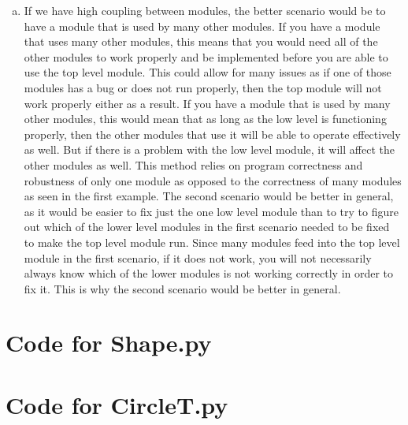 \documentclass[12pt]{article}
\begin{document}
\begin{enumerate}[a)]
\item If we have high coupling between modules, the better scenario would be to have a module 
that is used by many other modules. If you have a module that uses many other modules, this means 
that you would need all of the other modules to work properly and be implemented before you are 
able to use the top level module. This could allow for many issues as if one of those modules has 
a bug or does not run properly, then the top module will not work properly either as a result. If 
you have a module that is used by many other modules, this would mean that as long as the low 
level is functioning properly, then the other modules that use it will be able to operate 
effectively as well. But if there is a problem with the low level module, it will affect the 
other modules as well. This method relies on program correctness and robustness of only one 
module as opposed to the correctness of many modules as seen in the first example. 
The second scenario would be better in general, as it would be easier to fix just the one low 
level module than to try to figure out which of the lower level modules in the first scenario 
needed to be fixed to make the top level module run. Since many modules feed into the top level 
module in the first scenario, if it does not work, you will not necessarily always know which of 
the lower modules is not working correctly in order to fix it. This is why the second scenario 
would be better in general. 

\end{enumerate}

\newpage

\lstset{language=Python, basicstyle=\tiny, breaklines=true, showspaces=false,
  showstringspaces=false, breakatwhitespace=true}

\def\thesection{\Alph{section}}

\section{Code for Shape.py}

\noindent 

\newpage

\section{Code for CircleT.py}

\noindent 
\end{document}
